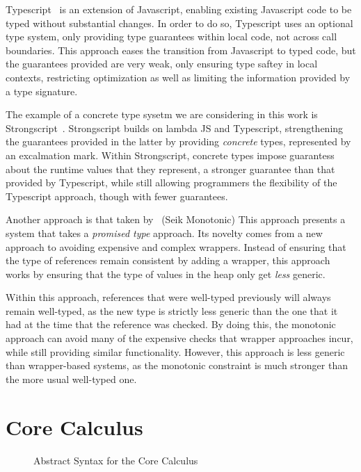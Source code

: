 \documentclass{sigplanconf}
\begin{document}
Typescript~\cite{typescript13} is an extension of Javascript, enabling existing 
Javascript code to be typed without substantial changes. In order to do so, 
Typescript uses an optional type system, only providing type guarantees within 
local code, not across call boundaries. This approach eases the transition from
Javascript to typed code, but the guarantees provided are very weak, only 
ensuring type saftey in local contexts, restricting optimization as well as
limiting the information provided by a type signature.

The example of a concrete type sysetm we are considering in this work is
Strongscript~\cite{stongscript}. Strongscript builds on lambda JS and 
Typescript, strengthening the guarantees provided in the latter by providing
\emph{concrete} types, represented by an excalmation mark. Within Strongscript,
concrete types impose guarantess about the runtime values that they represent, 
a stronger guarantee than that provided by Typescript, while still allowing
programmers the flexibility of the Typescript approach, though with fewer
guarantees.

Another approach is that taken by~\cite{seik-monotonic} (Seik Monotonic)
This approach presents a system that takes a \emph{promised type} approach.
Its novelty comes from a new approach to avoiding expensive and complex
wrappers. Instead of ensuring that the type of references remain consistent
by adding a wrapper, this approach works by ensuring that the type of values in
the heap only get \emph{less} generic.

Within this approach, references that were well-typed previously will always
remain well-typed, as the new type is strictly less generic than the one that
it had at the time that the reference was checked. By doing this, the monotonic
approach can avoid many of the expensive checks that wrapper approaches incur, 
while still providing similar functionality. However, this approach is less
generic than wrapper-based systems, as the monotonic constraint is much stronger
than the more usual well-typed one.

\section{Core Calculus}

\begin{figure}
\syntax

\caption{Abstract Syntax for the Core Calculus}
\end{figure}
\end{document}
